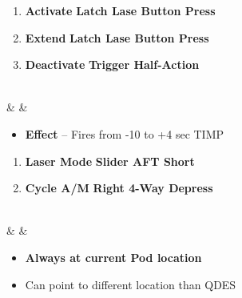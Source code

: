 \documentclass[fontInter]{TechCheck}
\begin{document}
\begin{listlongtable}
\begin{minipage}[t]{\linewidth}
\begin{itemize}
			\end{itemize}
			\begin{enumerate}
				\item \textbf{Activate} \dotfill \textbf{Latch Lase Button Press}
				\item \textbf{Extend} \dotfill \textbf{Latch Lase Button Press}
				\item \textbf{Deactivate} \dotfill \textbf{Trigger Half-Action}
			\end{enumerate}
		\end{minipage} \\
		\midrule
		\textbf{\textbullet} &  &
		\begin{minipage}[t]{\linewidth}
			\vspace{-7pt}
			\begin{itemize}
				\item \textbf{Effect} -- Fires from -10 to +4 sec TIMP
			\end{itemize}
			\begin{enumerate}
				\item \textbf{Laser Mode} \dotfill \textbf{Slider AFT Short}
				\item \textbf{Cycle A/M} \dotfill \textbf{Right 4-Way Depress}
			\end{enumerate}
		\end{minipage} \\
		\midrule
		\textbf{\textbullet} &  &
		\begin{minipage}[t]{\linewidth}
			\vspace{-7pt}
			\begin{itemize}
				\item \textbf{Always at current Pod location}
				\item Can point to different location than QDES
			\end{itemize}
		\end{minipage} \\
	\end{listlongtable}
\end{document}

